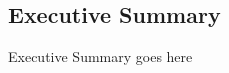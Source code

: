\begin{center}
\section*{\textbf{Executive Summary}}
\end{center}

Executive Summary goes here

\newpage


